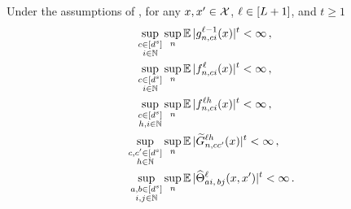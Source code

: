 \begin{lemma}\label{lem:mmnt_propagation}
    Under the assumptions of , for any $x, x' \in \mathcal{X}$, $\ell \in [L + 1]$, and $t \geq 1$
    \begin{align*}
       \sup_{\substack{c \in [d^s] \\ i \in \mathbb{N}}}
       &\sup_{n}
            \operatorname*{\mathbb{E}} | 
                {g}^{\ell - 1}_{n, c i}{(x)} 
            |^t
        <
        \infty
        \, ,
        \\
       \sup_{\substack{c \in [d^s] \\ i \in \mathbb{N}}}
       &\sup_{n}
            \operatorname*{\mathbb{E}} | 
                {f}^{\ell}_{n, c i}{(x)} 
            |^t
        <
        \infty
        \, ,
        \\
        \sup_{\substack{c \in [d^s] \\ h, i \in \mathbb{N}}}
        &\sup_{n}
        \operatorname*{\mathbb{E}} |
            {f}^{\ell h}_{n, c i}{(x)}
        |^{t}
        <
        \infty
        \, ,
        \\
        \sup_{\substack{
            c, c' \in [d^s] \\
            h \in \mathbb{N}
        }}
        &\sup_{n}
            \operatorname*{\mathbb{E}} |
                \widetilde{G}_{n, c c'}^{\ell h} (x)
            |^t
        <
        \infty
        \, ,
        \\
        \sup_{\substack{
            a, b \in [d^s] \\
            i, j \in \mathbb{N}
        }}
        &\sup_{n}
            \operatorname*{\mathbb{E}} |
                \widehat{\Theta}_{a i , \, b j}^{\ell} ( x, x' ) 
            |^t
        <
        \infty
        \, .
    \end{align*}
\end{lemma}

